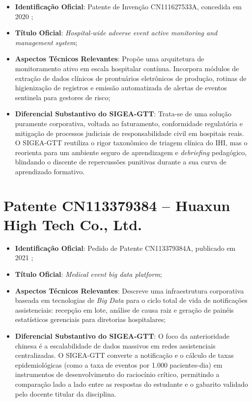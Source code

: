 \begin{itemize}
    \item \textbf{Identificação Oficial}: Patente de Invenção CN111627533A, concedida em 2020 \cite{patente_cn111627533};
    \item \textbf{Título Oficial}: \textit{Hospital-wide adverse event active monitoring and management system};
    \item \textbf{Aspectos Técnicos Relevantes}: Propõe uma arquitetura de monitoramento ativo em escala hospitalar contínua. Incorpora módulos de extração de dados clínicos de prontuários eletrônicos de produção, rotinas de higienização de registros e emissão automatizada de alertas de eventos sentinela para gestores de risco;
    \item \textbf{Diferencial Substantivo do SIGEA-GTT}: Trata-se de uma solução puramente corporativa, voltada ao faturamento, conformidade regulatória e mitigação de processos judiciais de responsabilidade civil em hospitais reais. O SIGEA-GTT reutiliza o rigor taxonômico de triagem clínica do IHI, mas o reorienta para um ambiente seguro de aprendizagem e \textit{debriefing} pedagógico, blindando o discente de repercussões punitivas durante a sua curva de aprendizado formativo.
\end{itemize}

\section{Patente CN113379384 -- Huaxun High Tech Co., Ltd.}
\label{sec_patente_huaxun}

\begin{itemize}
    \item \textbf{Identificação Oficial}: Pedido de Patente CN113379384A, publicado em 2021 \cite{patente_cn113379384};
    \item \textbf{Título Oficial}: \textit{Medical event big data platform};
    \item \textbf{Aspectos Técnicos Relevantes}: Descreve uma infraestrutura corporativa baseada em tecnologias de \textit{Big Data} para o ciclo total de vida de notificações assistenciais: recepção em lote, análise de causa raiz e geração de painéis estatísticos gerenciais para diretorias hospitalares;
    \item \textbf{Diferencial Substantivo do SIGEA-GTT}: O foco da anterioridade chinesa é a escalabilidade de dados massivos em redes assistenciais centralizadas. O SIGEA-GTT converte a notificação e o cálculo de taxas epidemiológicas (como a taxa de eventos por 1.000 pacientes-dia) em instrumentos de desenvolvimento do raciocínio crítico, permitindo a comparação lado a lado entre as respostas do estudante e o gabarito validado pelo docente titular da disciplina.
\end{itemize}

